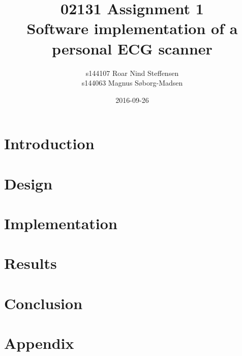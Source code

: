 \documentclass{article}
\title{02131 Assignment 1 \\Software implementation of a personal ECG scanner}
\author{s144107 Roar Nind Steffensen\\s144063 Magnus Søborg-Madsen}
\date{2016-09-26}
\numberwithin{figure}{section}
\numberwithin{equation}{section}
\begin{document}




\newpage
\setcounter{tocdepth}{2}

\tableofcontents
\vfill

\vspace{1 cm}

\newpage
\section{Introduction}


\section{Design}





\section{Implementation}




\section{Results}



\section{Conclusion}


\newpage
\section{Appendix}

\newpage

\end{document}
